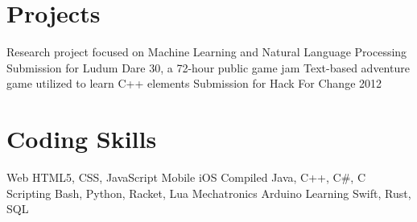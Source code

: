 \documentclass[11pt,a4paper,sans]{moderncv}        %
\begin{document}
\section{Projects}		%
			{Research project focused on Machine Learning and Natural Language Processing}
			{Submission for Ludum Dare 30, a 72-hour public game jam}
			{Text-based adventure game utilized to learn C++ elements}
	{Submission for Hack For Change 2012}

\section{Coding Skills}	%
\cvdoubleitem
{Web}	                {HTML5, CSS, JavaScript}
{Mobile}	        {iOS}
\cvdoubleitem
{Compiled}	        {Java, C++, C\#, C}
{Scripting}		{Bash, Python, Racket, Lua}
\cvdoubleitem
{Mechatronics}	        {Arduino}
{Learning}		{Swift, Rust, SQL}
\end{document}
